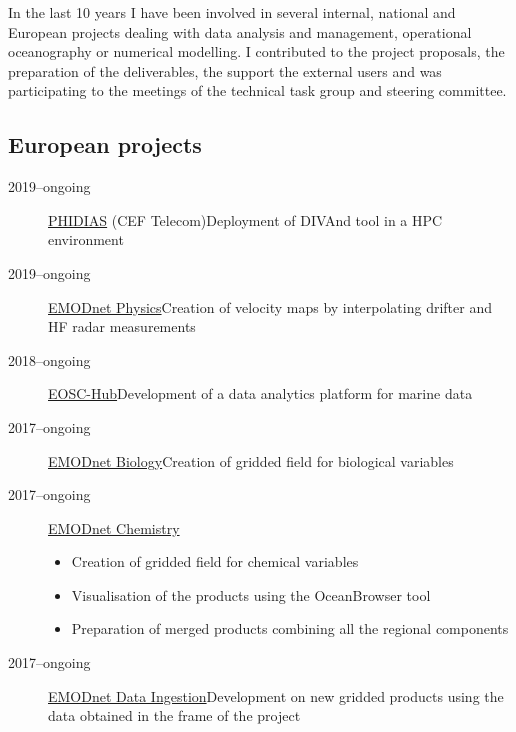 \documentclass[11pt,a4paper,svgnames]{article}
\begin{document}
\begin{summarybox}
{In the last 10 years I have been involved in several internal, national and European projects dealing with data analysis and management, operational oceanography or numerical modelling. I contributed to the project proposals, the preparation of the deliverables, the support the external users and was participating to the meetings of the technical task group and steering committee.}
\end{summarybox}

\subsection{European projects}

\begin{description}

\item[2019--ongoing]{\href{https://www.phidias-hpc.eu/}{PHIDIAS} (CEF Telecom)}{}{Deployment of DIVAnd tool in a HPC environment}{}{}

\item[2019--ongoing]{\href{https://www.emodnet-physics.eu}{EMODnet Physics}}{}{Creation of velocity maps by interpolating drifter and HF radar measurements}{}{}

\item[2018--ongoing]{\href{https://www.eosc-hub.eu}{EOSC-Hub}}{}{Development of a data analytics platform for marine data}{}{}

\item[2017--ongoing]{\href{https://emodnet-biology.eu}{EMODnet Biology}}{}{Creation of gridded field for biological variables}{}{}

\item[2017--ongoing]{\href{https://www.emodnet-chemistry.eu}{EMODnet Chemistry}} {\begin{itemize}
\item Creation of gridded field for chemical variables 
\item Visualisation of the products using the OceanBrowser tool
\item Preparation of merged products combining all the regional components
\end{itemize}}

\item[2017--ongoing]{\href{https://www.emodnet-ingestion.eu}{EMODnet Data Ingestion}}{}{Development on new gridded products using the data obtained in the frame of the project}{}{}


\end{description}
\end{document}
